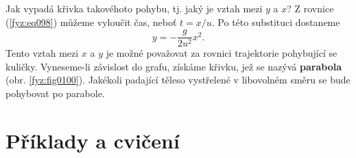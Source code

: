     Jak vypadá křivka takovéhoto pohybu, tj. jaký je vztah mezi \(y\) a \(x\)? Z rovnice 
    (\ref{fyz:eq098}) můžeme vyloučit čas, neboť \(t= x/u\). Po této substituci dostaneme
    \begin{equation}\label{fyz:eq099}
      y = -\frac{g}{2u^2}x^2.
    \end{equation}
    Tento vztah mezi \(x\) a \(y\) je možné považovat za rovnici trajektorie pohybující se kuličky. 
    Vyneseme-li závislost do grafu, získáme křivku, jež se nazývá \textbf{parabola} (obr. 
    \ref{fyz:fig0100}). Jakékoli padající těleso vystřelené v libovolném směru se bude pohybovat po 
    parabole. 
  
  \section{Příklady a cvičení}
      

